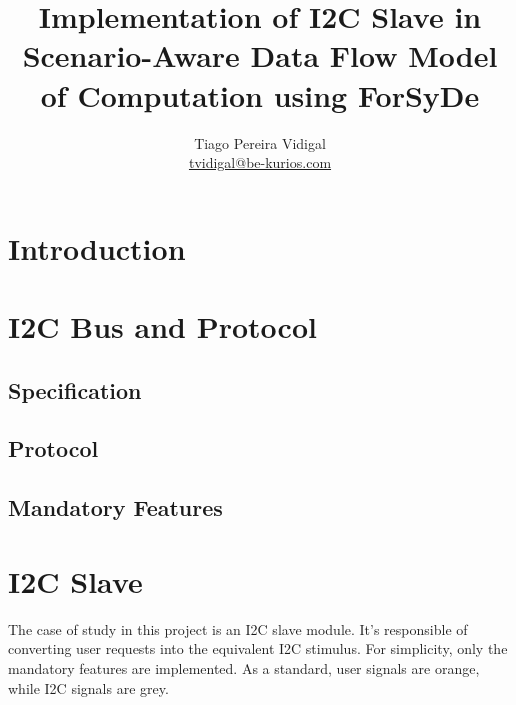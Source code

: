 \documentclass{article}
\begin{document}

\title{Implementation of I2C Slave in Scenario-Aware Data Flow Model of Computation using ForSyDe}
\author{Tiago Pereira Vidigal \\ \href{mailto:tvidigal@be-kurios.com}{tvidigal@be-kurios.com} }
\maketitle


\section{Introduction} \label{sec:intro}


\section{I2C Bus and Protocol} \label{sec:proto}
\subsection{Specification}
\subsection{Protocol}
\subsection{Mandatory Features}


\section{I2C Slave} \label{sec:slave}
The case of study in this project is an I2C slave module. It's responsible of converting user requests into the equivalent I2C stimulus. For simplicity, only the mandatory features are implemented. As a standard, user signals are orange, while I2C signals are grey.
\end{document}
